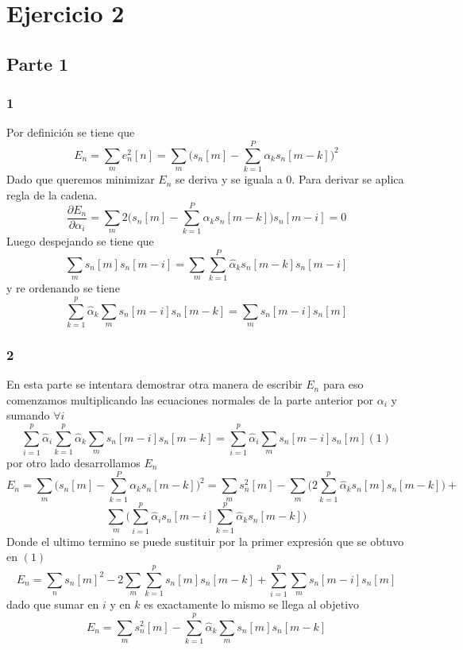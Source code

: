 \documentclass[a4paper]{article}
\begin{document}
\section{Ejercicio 2}
\subsection{Parte 1}
\subsubsection{1}
Por definición se tiene que 
$$E_n = \sum_m e_n^2[n] = \sum_m \bigg(s_n[m]-\sum_{k=1}^P\alpha_ks_n[m-k]\bigg)^2$$
Dado que queremos minimizar $E_n$ se deriva y se iguala a 0. Para derivar se aplica regla de la cadena.
$$\frac{\partial E_n}{\partial \alpha_i}= \sum_m 2 \bigg(s_n[m]-\sum_{k=1}^P\alpha_ks_n[m-k]\bigg)s_n[m-i]=0$$
Luego despejando se tiene que
$$\sum_m s_n[m]s_n[m-i] = \sum_m \sum_{k=1}^P \hat{\alpha}_ks_n[m-k]s_n[m-i]$$
y re ordenando se tiene
$$\sum_{k=1}^{p}\hat{\alpha}_k\sum_m s_n[m-i]s_n[m-k]=\sum_m s_n[m-i]s_n[m]$$
\subsubsection{2}
En esta parte se intentara demostrar otra manera de escribir $E_n$ para eso comenzamos multiplicando las ecuaciones normales de la parte anterior por $\alpha_i$ y sumando $\forall i$
$$\sum_{i=1}^p\hat{\alpha}_i\sum_{k=1}^p\hat{\alpha}_k\sum_ms_n[m-i]s_n[m-k]=\sum_{i=1}^p\hat{\alpha}_i\sum_ms_n[m-i]s_n[m](1)$$
por otro lado desarrollamos $E_n$
$$E_n = \sum_m \bigg(s_n[m]-\sum_{k=1}^P\alpha_ks_n[m-k]\bigg)^2 = \sum_m s_n^2[m] -\sum_m\bigg(2\sum_{k=1}^p\hat{\alpha}_ks_n[m]s_n[m-k]\bigg) +$$
$$
\sum_m\bigg(\sum_{i=1}^p\hat{\alpha}_i s_n[m-i]\sum_{k=1}^p\hat{\alpha}_ks_n[m-k]\bigg)$$
Donde el ultimo termino se puede sustituir por la primer expresión que se obtuvo en $(1)$ 
$$E_n = \sum_n s_n[m]^2 - 2\sum_m\sum_{k=1}^ps_n[m]s_n[m-k] +\sum_{i=1}^p\sum_ms_n[m-i]s_n[m]$$
dado que sumar en $i$ y en $k$ es exactamente lo mismo se llega al objetivo
$$E_n = \sum_m s_n^2[m]-\sum_{k=1}^p\hat{\alpha}_k\sum_m s_n[m]s_n[m-k]$$
\end{document}

